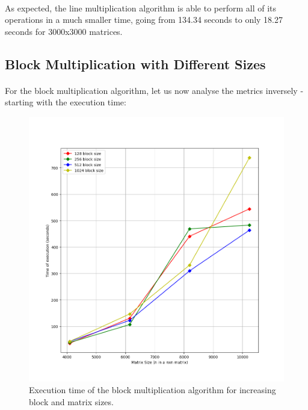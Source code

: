 \documentclass{report}
\begin{document}
				\paragraph{}As expected, the line multiplication algorithm is able to perform all of its operations in a much smaller time, going from 134.34 seconds to only 18.27 seconds for 3000x3000 matrices.
			
			\subsection{Block Multiplication with Different Sizes}
			
				\paragraph{}For the block multiplication algorithm, let us now analyse the metrics inversely - starting with the execution time:
				
				\begin{figure}[H]
					\begin{adjustbox}{center}
						\includegraphics[scale=0.5]{cpp_block_comparison.png}
					\end{adjustbox}
					\caption{Execution time of the block multiplication algorithm for increasing block and matrix sizes.}
				\end{figure}
			
\end{document}
